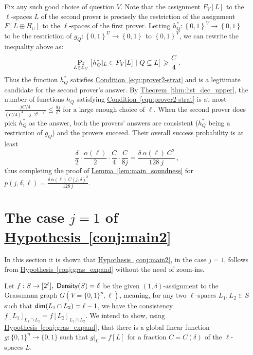 \documentclass[11pt]{article}
\numberwithin{equation}{section}
\theoremstyle{definition}
\theoremstyle{plain}
\newcommand{\expref}[2]{\hyperref[#2]{#1~\ref{#2}}}
\newcommand{\expeqref}[2]{\hyperref[#2]{#1~\eqref{#2}}}
\newcommand\set[1]{{\left\{ #1 \right\}}}
\newcommand\Prob[2]{{\Pr_{#1}\left[ {#2} \right]}}
\newcommand\power[1]{\set{0,1}^{#1}}
\newcommand*\xor{\mathbin{\oplus}}
\renewcommand\leq{\leqslant}
\begin{document}
Fix any such good choice of question $V$.
Note that the assignment $F_V[L]$ to the $\ell$-spaces $L$ of the second prover is precisely the restriction of the assignment $F[L\xor H_U]$ to
the $\ell$-spaces of the first prover. Letting $h^*_Q: \power{V}\to\power{}$ to be the restriction of $g_Q:\power{U}\to \power{}$ to $\power{V}$,
we can rewrite the inequality above as:
\[
  \Prob{L \in {\cal L}_V}{h^*_Q|_L  \in F_V[L]  ~|  ~Q \subseteq L}\geqslant \frac{C}{4}\,.%
\]
Thus the function $h^*_Q$ satisfies \expeqref{Condition}{eqn:prover2-strat} and is a legitimate candidate for the second prover's answer. By \expref{Theorem}{thm:list_dec_upper}, the number of functions $h_Q$ satisfying \expeqref{Condition}{eqn:prover2-strat} is at most $\frac{jC/4}{(C/4)^2-j\cdot 2^{q-\ell}} \leq
 \frac{8 j}{C}$ for a large enough choice of $\ell$. When the second prover does pick $h^*_Q$ as the answer, both the provers' answers are
 consistent ($h^*_Q$ being a restriction of $g_Q$) and the provers succeed. Their overall success probability is at least
\[
\frac{\delta}{2} \cdot \frac{\alpha(\ell)}{2} \cdot \frac{C}{4} \cdot \frac{C}{8j} =
\frac{\delta ~\alpha(\ell) ~C^2}{128 ~j}\,,%
\]
thus completing the proof of \expref{Lemma}{lem:main_soundness} for $p(j,\delta,\ell) = \frac{\delta ~\alpha(\ell) ~C(j,\delta)^2}{128 ~j}$.



\section{The case \texorpdfstring{$j=1$}{j=1} of \expref{Hypothesis}{conj:main2}}
\label{section:j_1}
In this section it is shown that \expref{Hypothesis}{conj:main2},
in the case $j=1$, follows from \expref{Hypothesis}{conj:gras_expand} without the need of zoom-ins.

\smallskip
Let $f:S \to [2^\ell], ~{\sf Density}(S)=\delta$ be the given $(1,\delta)$-assignment to
the Grassmann graph $G(V=\{0,1\}^n, \ell)$, meaning, for any two $\ell$-spaces
$L_1, L_2 \in S$ such that ${\sf dim} (L_1 \cap L_2) = \ell-1$, we have the consistency $f[L_1]_{L_1 \cap L_2} = f[L_2]_{L_1 \cap L_2}$.
We intend to show, using \expref{Hypothesis}{conj:gras_expand}, that there is a global
linear function $g: \{0,1\}^n \to \{0,1\}$ such that $g|_L = f[L]$ for a fraction $C = C(\delta)$ of the $\ell$-spaces $L$.
\end{document}
